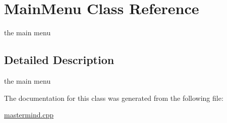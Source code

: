 \hypertarget{class_main_menu}{\section{Main\-Menu Class Reference}
\label{class_main_menu}
}


the main menu  




\subsection{Detailed Description}
the main menu 

The documentation for this class was generated from the following file\-:\begin{DoxyCompactItemize}
\item 
\hyperlink{mastermind_8cpp}{mastermind.\-cpp}\end{DoxyCompactItemize}
